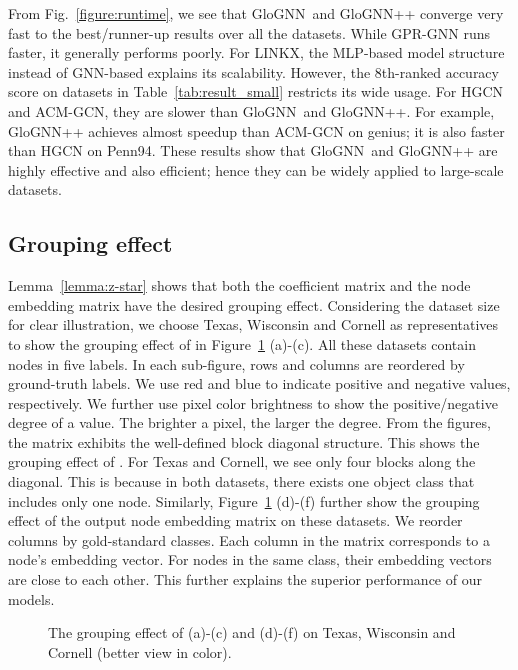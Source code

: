 \documentclass[nohyperref]{article}
\theoremstyle{plain}
\theoremstyle{definition}
\theoremstyle{remark}
\newcommand{\ada}{GloGNN}
\begin{document}
From Fig.~\ref{figure:runtime}, 
we see that \ada\ and \ada++ converge very fast to the best/runner-up results over all the datasets.
While GPR-GNN runs faster,
it generally performs poorly. 
For LINKX,
the
MLP-based model structure instead of GNN-based explains its scalability.
However,
the 8th-ranked accuracy score on datasets in Table~\ref{tab:result_small}
restricts its wide usage.
For HGCN and ACM-GCN,
they are slower than \ada\ and \ada++.
For example,
\ada++ achieves almost  speedup than ACM-GCN on genius;
it is also  faster than HGCN on Penn94.
These results show that \ada\ and \ada++
are highly effective and also efficient;
hence they can be widely applied to large-scale datasets.








\subsection{Grouping effect}


Lemma~\ref{lemma:z-star} shows that both the coefficient matrix  and the node embedding matrix  have the desired grouping effect.
Considering the dataset size for clear illustration,
we choose Texas, Wisconsin and Cornell as representatives to show the grouping effect of  in Figure~\ref{figure:z} (a)-(c).
All these datasets contain nodes in five labels.
In 
each sub-figure, 
rows and columns are reordered by ground-truth labels.
We use 
red and blue to indicate positive and negative values, respectively.
We further use pixel color brightness to show the positive/negative degree of a value.
The brighter a pixel,
the larger the degree. 
From the figures,
the matrix exhibits the well-defined block diagonal structure.
This shows the grouping effect of .
For Texas and Cornell,
we see only four blocks along the diagonal.
This 
is because in both datasets, 
there exists one object class that includes only one node.
Similarly,
Figure~\ref{figure:z} (d)-(f) further show the grouping effect of 
the output node embedding matrix  on these datasets.
We reorder columns by gold-standard classes.
Each column in the matrix corresponds to a node's embedding vector.
For nodes in the same class,
their embedding vectors are close to each other.
This further explains the superior performance of our models.

\begin{figure}[!htbp]
    \centering
     \caption{The grouping effect of  (a)-(c) and  (d)-(f) on Texas, Wisconsin and Cornell (better view in color).}
     \label{figure:z}
\end{figure}
\end{document}
